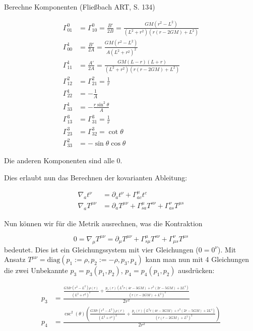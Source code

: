 \documentclass[12pt,a4paper]{article}
\begin{document}
Berechne Komponenten (Fließbach ART, S. 134)

\begin{align}
\Gamma^{0}_{01} &= \Gamma^{0}_{10} = \frac{B'}{2B} = \frac{G M \left(r^2-L^2\right)}{\left(L^2+r^2\right) \left(r (r-2 G
   M)+L^2\right)} \\
%
\Gamma^1_{00} &= \frac{B'}{2A} = \frac{G M \left(r^2-L^2\right)}{A \left(L^2+r^2\right)^2} \\
%
\Gamma^1_{11} &= \frac{A'}{2A} = \frac{G M (L-r) (L+r)}{\left(L^2+r^2\right) \left(r (r-2 G M)+L^2\right)} \\
%
\Gamma^2_{12} &= \Gamma^2_{21} = \frac{1}{r} \\
%
\Gamma^1_{22} &= -\frac{1}{A} \\
%
\Gamma^1_{33} &= -\frac{r\sin^2 \theta}{A} \\
%
\Gamma^3_{13} &= \Gamma^3_{31} = \frac 1r \\
%
\Gamma^3_{23} &= \Gamma^3_{32} = \cot \theta \\
%
\Gamma^2_{33} &= -\sin \theta \cos \theta
\end{align}

Die anderen Komponenten sind alle 0.

Dies erlaubt nun das Berechnen der kovarianten Ableitung:

\begin{align}
\nabla_a t^\nu &= \partial_a t^\nu + \Gamma^\mu_{ac} t^c \\
\nabla_a T^{\mu \nu} &= \partial_a T^{\mu\nu} + \Gamma_{sa}^\mu T^{s\nu} + \Gamma_{as}^{\nu} T^{\mu s}
\end{align}

Nun können wir für die Metrik ausrechnen, was die Kontraktion

\begin{equation}
0 = \nabla_\mu T^{\mu \nu} = \partial_\mu T^{\mu\nu} + \Gamma_{s\mu}^\mu T^{s\nu} + \Gamma^\nu_{\mu s} T^{\mu s}
\end{equation}
bedeutet. Dies ist ein Gleichungssystem mit vier Gleichungen ($0=0^\nu$).  Mit Ansatz
$T^{\mu \nu} = \text{diag}(p_1 := \rho, p_2 := -\rho, p_3, p_4)$ kann man nun mit 4 Gleichungen die zwei Unbekannte $p_3 = p_3(p_1,p_2)$, $p_4 = p_4(p_1,p_2)$ ausdrücken:

\begin{align}
p_3 &= \frac{\frac{G M r \left(r^2-L^2\right) \rho (r)}{\left(L^2+r^2\right)^2}+\frac{p_r(r) \left(L^2 r (4 r-3 G M)+r^3 (2 r-5 G M)+2 L^4\right)}{\left(r (r-2 G
   M)+L^2\right)^2}}{2 r^2} \label{myp3} \\
%
p_4 &= \frac{\csc ^2(\theta ) \left(\frac{G M r \left(r^2-L^2\right) \rho (r)}{\left(L^2+r^2\right)^2}+\frac{p_r(r) \left(L^2 r (4 r-3 G M)+r^3 (2 r-5 G M)+2
   L^4\right)}{\left(r (r-2 G M)+L^2\right)^2}\right)}{2 r^2} \label{myp4}
\end{align}
\end{document}
